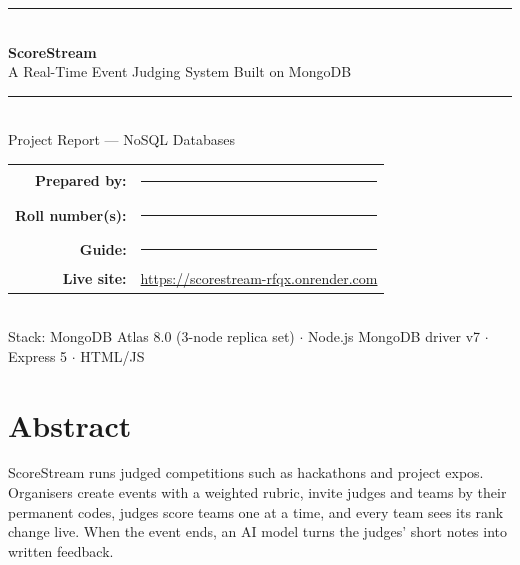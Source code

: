 \documentclass[11pt,a4paper]{article}
\begin{document}
\begin{titlepage}
  \centering
  \vspace*{1.5cm}
  {\color{mongo}\rule{\linewidth}{2pt}}\\[1.2em]
  {\Huge\bfseries\color{ink} ScoreStream}\\[0.6em]
  {\Large\color{ink} A Real-Time Event Judging System Built on MongoDB}\\[1.2em]
  {\color{mongo}\rule{\linewidth}{2pt}}\\[2.2em]
  {\large Project Report --- NoSQL Databases}\\[3em]


  \vfill
  \begin{tabular}{rl}
    \textbf{Prepared by:} & \rule{7cm}{0.4pt}\\[0.6em]
    \textbf{Roll number(s):} & \rule{7cm}{0.4pt}\\[0.6em]
    \textbf{Guide:} & \rule{7cm}{0.4pt}\\[0.6em]
    \textbf{Live site:} & \url{https://scorestream-rfqx.onrender.com}\\
  \end{tabular}\\[2em]
  {\small\color{cmt} Stack: MongoDB Atlas 8.0 (3-node replica set) $\cdot$ Node.js MongoDB driver v7 $\cdot$ Express 5 $\cdot$ HTML/JS}
\end{titlepage}

\section*{Abstract}
ScoreStream runs judged competitions such as hackathons and project expos. Organisers create events with a weighted
rubric, invite judges and teams by their permanent codes, judges score teams one at a time, and every team sees its
rank change live. When the event ends, an AI model turns the judges' short notes into written feedback.
\end{document}
